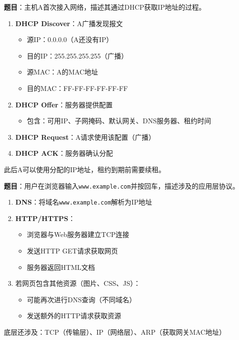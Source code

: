 \begin{examplebox}[例题6.7 DHCP工作过程]
\textbf{题目}：主机A首次接入网络，描述其通过DHCP获取IP地址的过程。
\tcblower
\begin{enumerate}[itemsep=0pt]
    \item \textbf{DHCP Discover}：A广播发现报文
    \begin{itemize}[itemsep=0pt]
        \item 源IP：0.0.0.0（A还没有IP）
        \item 目的IP：255.255.255.255（广播）
        \item 源MAC：A的MAC地址
        \item 目的MAC：FF-FF-FF-FF-FF-FF
    \end{itemize}
    
    \item \textbf{DHCP Offer}：服务器提供配置
    \begin{itemize}[itemsep=0pt]
        \item 包含：可用IP、子网掩码、默认网关、DNS服务器、租约时间
    \end{itemize}
    
    \item \textbf{DHCP Request}：A请求使用该配置（广播）
    
    \item \textbf{DHCP ACK}：服务器确认分配
\end{enumerate}

此后A可以使用分配的IP地址，租约到期前需要续租。
\end{examplebox}

\begin{examplebox}[例题6.8 应用层协议综合]
\textbf{题目}：用户在浏览器输入\texttt{www.example.com}并按回车，描述涉及的应用层协议。
\tcblower
\begin{enumerate}[itemsep=0pt]
    \item \textbf{DNS}：将域名\texttt{www.example.com}解析为IP地址
    
    \item \textbf{HTTP/HTTPS}：
    \begin{itemize}[itemsep=0pt]
        \item 浏览器与Web服务器建立TCP连接
        \item 发送HTTP GET请求获取网页
        \item 服务器返回HTML文档
    \end{itemize}
    
    \item 若网页包含其他资源（图片、CSS、JS）：
    \begin{itemize}[itemsep=0pt]
        \item 可能再次进行DNS查询（不同域名）
        \item 发送额外的HTTP请求获取资源
    \end{itemize}
\end{enumerate}

底层还涉及：TCP（传输层）、IP（网络层）、ARP（获取网关MAC地址）
\end{examplebox}

